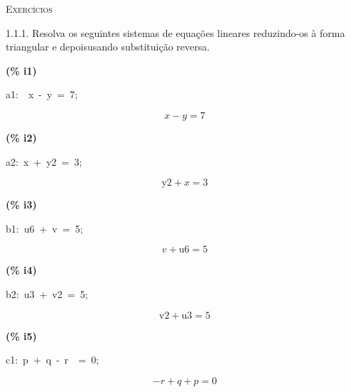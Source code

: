 \documentclass[fleqn]{article}
\begin{document}
\pagebreak{}
{\Huge {\scshape Exercícios}}
\setcounter{section}{0}
\setcounter{subsection}{0}
\setcounter{figure}{0}

1.1.1. Resolva os seguintes sistemas de equações lineares reduzindo-os à forma triangular e depoisusando substituição reversa.


\noindent
\begin{minipage}[t]{4.000000em}\color{red}\bfseries
(\% i1)	
\end{minipage}
\begin{minipage}[t]{\textwidth}\color{blue}
a1:\ \ x\ -\ y\ =\ 7;
\end{minipage}
\[\displaystyle \tag{a1} 
x\mathop{-}y\mathop{=}7\mbox{}
\]


\noindent
\begin{minipage}[t]{4.000000em}\color{red}\bfseries
(\% i2)	
\end{minipage}
\begin{minipage}[t]{\textwidth}\color{blue}
a2:\ x\ +\ y2\ =\ 3;
\end{minipage}
\[\displaystyle \tag{a2} 
\ensuremath{\mathrm{y2}}\mathop{+}x\mathop{=}3\mbox{}
\]


\noindent
\begin{minipage}[t]{4.000000em}\color{red}\bfseries
(\% i3)	
\end{minipage}
\begin{minipage}[t]{\textwidth}\color{blue}
b1:\ u6\ +\ v\ =\ 5;
\end{minipage}
\[\displaystyle \tag{b1} 
v\mathop{+}\ensuremath{\mathrm{u6}}\mathop{=}5\mbox{}
\]


\noindent
\begin{minipage}[t]{4.000000em}\color{red}\bfseries
(\% i4)	
\end{minipage}
\begin{minipage}[t]{\textwidth}\color{blue}
b2:\ u3\ +\ v2\ =\ 5;
\end{minipage}
\[\displaystyle \tag{b2} 
\ensuremath{\mathrm{v2}}\mathop{+}\ensuremath{\mathrm{u3}}\mathop{=}5\mbox{}
\]


\noindent
\begin{minipage}[t]{4.000000em}\color{red}\bfseries
(\% i5)	
\end{minipage}
\begin{minipage}[t]{\textwidth}\color{blue}
c1:\ p\ +\ q\ -\ r\ \ =\ 0;\ 
\end{minipage}
\[\displaystyle \tag{c1} 
\mathop{-}r\mathop{+}q\mathop{+}p\mathop{=}0\mbox{}
\]
\end{document}
